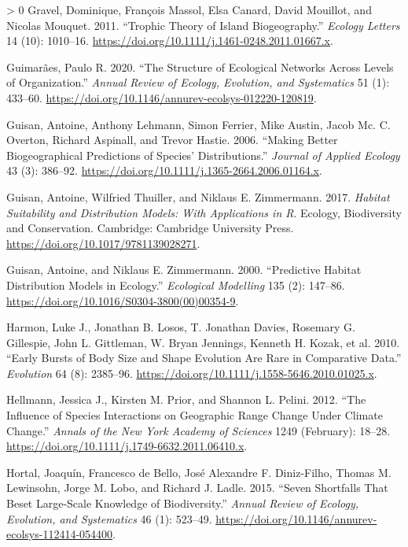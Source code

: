 \documentclass[12pt]{article}
\newlength{\cslhangindent}
\newenvironment{CSLReferences}[3] %
 {%
  \setlength{\parindent}{0pt}
  \ifodd #1 \everypar{\setlength{\hangindent}{\cslhangindent}}\ignorespaces\fi
  \ifnum #2 > 0
  \setlength{\parskip}{#2\baselineskip}
  \fi
 }%
 {}
\begin{document}
\begin{CSLReferences}{1}{0}
\leavevmode\hypertarget{ref-Gravel2011TroThe}{}%
Gravel, Dominique, François Massol, Elsa Canard, David Mouillot, and
Nicolas Mouquet. 2011. {``Trophic Theory of Island Biogeography.''}
\emph{Ecology Letters} 14 (10): 1010--16.
\url{https://doi.org/10.1111/j.1461-0248.2011.01667.x}.

\leavevmode\hypertarget{ref-Guimaraes2020StrEco}{}%
Guimarães, Paulo R. 2020. {``The Structure of Ecological Networks Across
Levels of Organization.''} \emph{Annual Review of Ecology, Evolution,
and Systematics} 51 (1): 433--60.
\url{https://doi.org/10.1146/annurev-ecolsys-012220-120819}.

\leavevmode\hypertarget{ref-Guisan2006MakBet}{}%
Guisan, Antoine, Anthony Lehmann, Simon Ferrier, Mike Austin, Jacob Mc.
C. Overton, Richard Aspinall, and Trevor Hastie. 2006. {``Making Better
Biogeographical Predictions of Species' Distributions.''} \emph{Journal
of Applied Ecology} 43 (3): 386--92.
\url{https://doi.org/10.1111/j.1365-2664.2006.01164.x}.

\leavevmode\hypertarget{ref-Guisan2017HabSui}{}%
Guisan, Antoine, Wilfried Thuiller, and Niklaus E. Zimmermann. 2017.
\emph{Habitat Suitability and Distribution Models: With Applications in
R}. Ecology, Biodiversity and Conservation. Cambridge: Cambridge
University Press. \url{https://doi.org/10.1017/9781139028271}.

\leavevmode\hypertarget{ref-Guisan2000PreHab}{}%
Guisan, Antoine, and Niklaus E. Zimmermann. 2000. {``Predictive Habitat
Distribution Models in Ecology.''} \emph{Ecological Modelling} 135 (2):
147--86. \url{https://doi.org/10.1016/S0304-3800(00)00354-9}.

\leavevmode\hypertarget{ref-Harmon2010EarBur}{}%
Harmon, Luke J., Jonathan B. Losos, T. Jonathan Davies, Rosemary G.
Gillespie, John L. Gittleman, W. Bryan Jennings, Kenneth H. Kozak, et
al. 2010. {``Early Bursts of Body Size and Shape Evolution Are Rare in
Comparative Data.''} \emph{Evolution} 64 (8): 2385--96.
\url{https://doi.org/10.1111/j.1558-5646.2010.01025.x}.

\leavevmode\hypertarget{ref-Hellmann2012InfSpe}{}%
Hellmann, Jessica J., Kirsten M. Prior, and Shannon L. Pelini. 2012.
{``The Influence of Species Interactions on Geographic Range Change
Under Climate Change.''} \emph{Annals of the New York Academy of
Sciences} 1249 (February): 18--28.
\url{https://doi.org/10.1111/j.1749-6632.2011.06410.x}.

\leavevmode\hypertarget{ref-Hortal2015SevSho}{}%
Hortal, Joaquín, Francesco de Bello, José Alexandre F. Diniz-Filho,
Thomas M. Lewinsohn, Jorge M. Lobo, and Richard J. Ladle. 2015. {``Seven
Shortfalls That Beset Large-Scale Knowledge of Biodiversity.''}
\emph{Annual Review of Ecology, Evolution, and Systematics} 46 (1):
523--49. \url{https://doi.org/10.1146/annurev-ecolsys-112414-054400}.


\end{CSLReferences}
\end{document}
